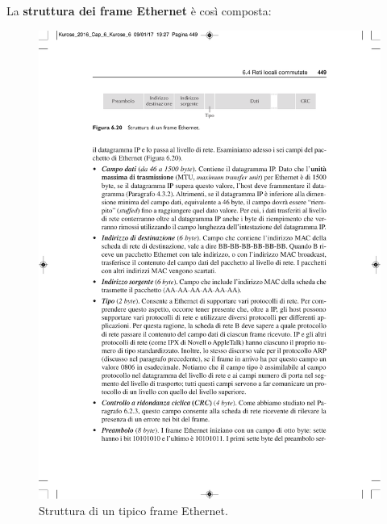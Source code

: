 \documentclass[a4paper]{article}
\begin{document}
	La \textcolor{Red3}{\textbf{struttura dei frame Ethernet}} è così composta:
	\begin{figure}[!htp]
		\centering
		\includegraphics[width=\textwidth]{img/struttura_frame_ethernet.pdf}
		\caption{Struttura di un tipico frame Ethernet.}
	\end{figure}
\end{document}
